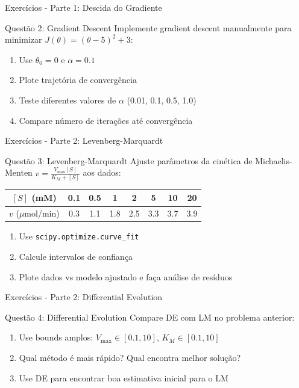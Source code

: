 \begin{frame}{Exercícios - Parte 1: Descida do Gradiente}
\begin{block}{Questão 2: Gradient Descent}
Implemente gradient descent manualmente para minimizar $J(\theta) = (\theta - 5)^2 + 3$:
\begin{enumerate}
    \item Use $\theta_0 = 0$ e $\alpha = 0.1$
    \item Plote trajetória de convergência
    \item Teste diferentes valores de $\alpha$ (0.01, 0.1, 0.5, 1.0)
    \item Compare número de iterações até convergência
\end{enumerate}
\end{block}
\end{frame}

\begin{frame}{Exercícios - Parte 2: Levenberg-Marquardt}
\begin{block}{Questão 3: Levenberg-Marquardt}
Ajuste parâmetros da cinética de Michaelis-Menten $v = \frac{V_{\max}[S]}{K_M + [S]}$ aos dados:
\begin{center}
\begin{tabular}{c|ccccccc}
$[S]$ (mM) & 0.1 & 0.5 & 1 & 2 & 5 & 10 & 20 \\
\hline
$v$ ($\mu$mol/min) & 0.3 & 1.1 & 1.8 & 2.5 & 3.3 & 3.7 & 3.9
\end{tabular}
\end{center}
\begin{enumerate}
    \item Use \texttt{scipy.optimize.curve\_fit}
    \item Calcule intervalos de confiança
    \item Plote dados vs modelo ajustado e faça análise de resíduos
\end{enumerate}
\end{block}
\end{frame}

\begin{frame}{Exercícios - Parte 2: Differential Evolution}
\begin{block}{Questão 4: Differential Evolution}
Compare DE com LM no problema anterior:
\begin{enumerate}
    \item Use bounds amplos: $V_{\max} \in [0.1, 10]$, $K_M \in [0.1, 10]$
    \item Qual método é mais rápido? Qual encontra melhor solução?
    \item Use DE para encontrar boa estimativa inicial para o LM
\end{enumerate}
\end{block}
\end{frame}

